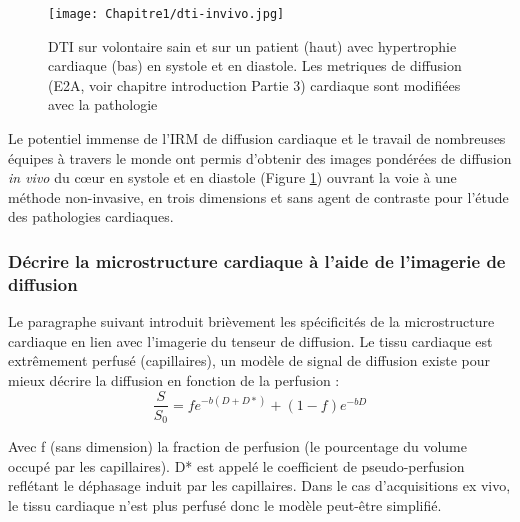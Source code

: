 \begin{figure}[!htbp]
  \begin{center}
    \texttt{[image: Chapitre1/dti-invivo.jpg]}
     \end{center}
    \caption{DTI sur volontaire sain et sur un patient (haut) avec hypertrophie cardiaque (bas) en systole et en diastole. Les metriques de diffusion (E2A, voir chapitre introduction Partie 3) cardiaque sont modifiées avec la pathologie}
  \label{fig:dti_inivo}
\end{figure}

Le potentiel immense de l’IRM de diffusion cardiaque et le travail de nombreuses équipes à travers le monde ont permis d’obtenir des images pondérées de diffusion \textit{in vivo} du cœur en systole et en diastole (Figure \ref{fig:dti_inivo}) ouvrant la voie à une méthode non-invasive, en trois dimensions et sans agent de contraste pour l’étude des pathologies cardiaques.


\subsubsection{Décrire la microstructure cardiaque à l’aide de l'imagerie de diffusion}


 Le paragraphe suivant introduit brièvement les spécificités de la microstructure cardiaque en lien avec l'imagerie du tenseur de diffusion. Le tissu cardiaque est extrêmement perfusé (capillaires), un modèle de signal de diffusion existe pour mieux décrire la diffusion en fonction de la perfusion \cite{NiellesVallespin2019} :
\begin{equation}
\nonumber
\frac{S}{S_0}=fe^{-b\left(D+D\ast\right)}+\left(1-f\right)e^{-bD}
\end{equation}

Avec f (sans dimension) la fraction de perfusion (le pourcentage du volume occupé par les capillaires). D* est appelé le coefficient de pseudo-perfusion reflétant le déphasage induit par les capillaires. Dans le cas d’acquisitions ex vivo, le tissu cardiaque n’est plus perfusé donc le modèle peut-être simplifié.

